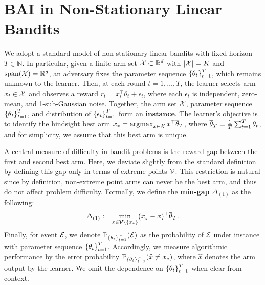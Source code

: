 \section{BAI in Non-Stationary Linear Bandits} \label{sec:bai}
We adopt a standard model of non-stationary linear bandits with fixed horizon $T\in\mathbb{N}$. In particular, given a finite arm set $\mathcal{X}\subset \mathbb{R}^d$ with $|\mathcal{X}|=K$ and $\mathrm{span}(\mathcal{X})=\mathbb{R}^d$, an adversary fixes the parameter sequence $\left\{\theta_t\right\}_{t=1}^T$, which remains unknown to the learner. Then, at each round $t=1, \dots, T$, the learner selects arm $x_t\in\mathcal{X}$ and observes a reward $r_t=x_t^\top\theta_t +\epsilon_t$, where each $\epsilon_t$ is independent, zero-mean, and 1-sub-Gaussian noise. Together, the arm set $\mathcal{X}$, parameter sequence $\left\{\theta_t\right\}_{t=1}^T$, and distribution of $\left\{\epsilon_t\right\}_{t=1}^T$ form an $\textbf{instance}$. The learner's objective is to identify the hindsight best arm $x_* =\operatorname*{argmax}_{x\in\mathcal{X}}x^\top\overline{\theta}_T$, where $\overline{\theta}_T=\frac{1}{T}\sum_{t=1}^T\theta_t$, and for simplicity, we assume that this best arm is unique.


A central measure of difficulty in bandit problems is the reward gap between the first and second best arm. Here, we deviate slightly from the standard definition by defining this gap only in terms of extreme points $\mathcal{V}$. This restriction is natural since by definition, non-extreme point arms can never be the best arm, and thus do not affect problem difficulty. Formally, we define the \textbf{min-gap} $\Delta_{(1)}$ as the following:
\begin{equation}
    \Delta_{(1)} := \min_{x \in \mathcal{V}\setminus \{x_*\}}(x_{_*} - x)^{\top}\overline{\theta}_{T}.
\end{equation}Finally, for event $\mathcal{E}$, we denote $\mathbb{P}_{\left\{\theta_t\right\}_{t=1}^T}(\mathcal{E})$ as the probability of $\mathcal{E}$ under instance with parameter sequence $\left\{\theta_t\right\}_{t=1}^T$. Accordingly, we measure algorithmic performance by the error probability $\mathbb{P}_{\left\{\theta_t\right\}_{t=1}^T}(\widehat{x}\neq x_*)$, where $\widehat{x}$ denotes the arm output by the learner. We omit the dependence on $\left\{\theta_t\right\}_{t=1}^T$ when clear from context.


